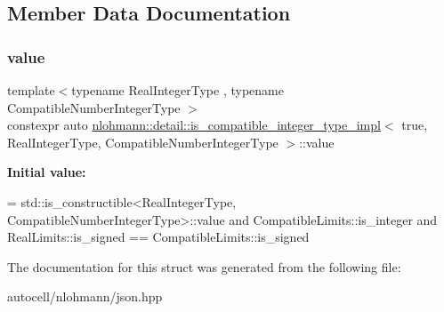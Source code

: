 \subsection{Member Data Documentation}
\mbox{\label{structnlohmann_1_1detail_1_1is__compatible__integer__type__impl_3_01true_00_01_real_integer_type78b0ba77f36a8c8169cdb79b01d1a4bf_a4c27142452b43418b1d5c0aad01bff50}} 
\subsubsection{\texorpdfstring{value}{value}}
{\footnotesize\ttfamily template$<$typename Real\+Integer\+Type , typename Compatible\+Number\+Integer\+Type $>$ \\
constexpr auto \mbox{\hyperlink{structnlohmann_1_1detail_1_1is__compatible__integer__type__impl}{nlohmann\+::detail\+::is\+\_\+compatible\+\_\+integer\+\_\+type\+\_\+impl}}$<$ true, Real\+Integer\+Type, Compatible\+Number\+Integer\+Type $>$\+::value\hspace{0.3cm}{\ttfamily [static]}}

{\bfseries Initial value\+:}
\begin{DoxyCode}
=
        std::is\_constructible<RealIntegerType, CompatibleNumberIntegerType>::value and
        CompatibleLimits::is\_integer and
        RealLimits::is\_signed == CompatibleLimits::is\_signed
\end{DoxyCode}


The documentation for this struct was generated from the following file\+:\begin{DoxyCompactItemize}
\item 
autocell/nlohmann/json.\+hpp\end{DoxyCompactItemize}
